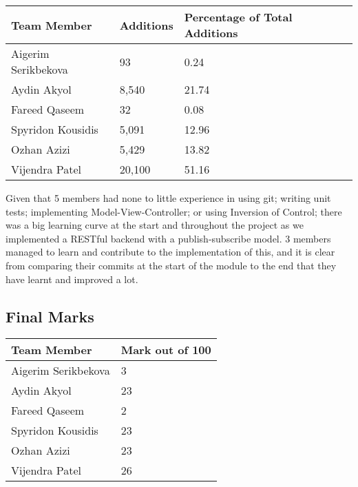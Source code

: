 \documentclass[11pt,a4paper]{report}
\begin{document}
\begin{center}
\begin{tabular}{| l | l | l |}
  \hline
  Team Member & Additions & Percentage of Total Additions\\
  \hline
  Aigerim Serikbekova & 93 & 0.24\\
  \hline
  Aydin Akyol & 8,540 & 21.74\\
  \hline
  Fareed Qaseem & 32 & 0.08\\
  \hline
  Spyridon Kousidis & 5,091 & 12.96\\
  \hline
  Ozhan Azizi & 5,429 & 13.82\\
  \hline
  Vijendra Patel & 20,100 & 51.16\\
  \hline
\end{tabular}
\end{center}

Given that 5 members had none to little experience in using git; writing unit tests; implementing Model-View-Controller; or using Inversion of Control; there was a big learning curve at the start and throughout the project as we implemented a RESTful backend with a publish-subscribe model. 3 members managed to learn and contribute to the implementation of this, and it is clear from comparing their commits at the start of the module to the end that they have learnt and improved a lot.

\subsection{Final Marks}

\begin{center}
\begin{tabular}{| l | l |}
  \hline
  Team Member & Mark out of 100 \\
  \hline
  Aigerim Serikbekova & 3\\
  \hline
  Aydin Akyol & 23\\
  \hline
  Fareed Qaseem & 2\\
  \hline
  Spyridon Kousidis & 23\\
  \hline
  Ozhan Azizi & 23\\
  \hline
  Vijendra Patel & 26\\
  \hline
\end{tabular}
\end{center}


{}
\end{document}
